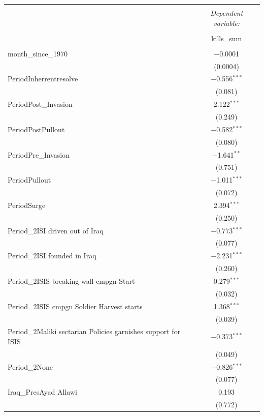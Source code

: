 \begin{table}[ht] \centering 
  \label{tab:poiss} 
\begin{adjustbox}{width=1\textwidth}
\small  
\begin{tabular}{@{\extracolsep{2pt}}lc} 
\hline \\[-0.8ex] 
 & \multicolumn{1}{c}{\textit{Dependent variable:}} \\ 
\cline{2-2} 
\\[-1.8ex] & kills\_sum \\ 
\hline \\[-1.8ex] 
 month\_since\_1970 & $-$0.0001 \\ 
  & (0.0004) \\ 
 PeriodInherrentresolve & $-$0.556$^{***}$ \\ 
  & (0.081) \\ 
 PeriodPost\_Invasion & 2.122$^{***}$ \\ 
  & (0.249) \\ 
 PeriodPostPullout & $-$0.582$^{***}$ \\ 
  & (0.080) \\ 
 PeriodPre\_Invasion & $-$1.641$^{**}$ \\ 
  & (0.751) \\ 
 PeriodPullout & $-$1.011$^{***}$ \\ 
  & (0.072) \\ 
 PeriodSurge & 2.394$^{***}$ \\ 
  & (0.250) \\ 
 Period\_2ISI driven out of Iraq & $-$0.773$^{***}$ \\ 
  & (0.077) \\ 
 Period\_2ISI founded in Iraq & $-$2.231$^{***}$ \\ 
  & (0.260) \\ 
 Period\_2ISIS breaking wall cmpgn Start & 0.279$^{***}$ \\ 
  & (0.032) \\ 
 Period\_2ISIS cmpgn Soldier Harvest starts & 1.368$^{***}$ \\ 
  & (0.039) \\ 
 Period\_2Maliki sectarian Policies garnishes support for ISIS & $-$0.373$^{***}$ \\ 
  & (0.049) \\ 
 Period\_2None & $-$0.826$^{***}$ \\ 
  & (0.077) \\ 
 Iraq\_PresAyad Allawi & 0.193 \\ 
  & (0.772) \\ 

\end{tabular}
\end{adjustbox}
\end{table}
